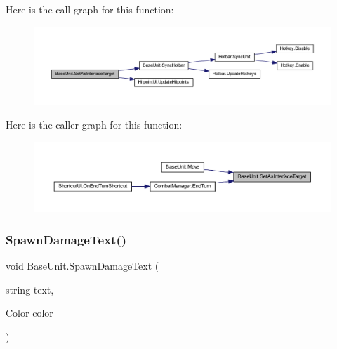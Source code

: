 Here is the call graph for this function\+:
\nopagebreak
\begin{figure}[H]
\begin{center}
\leavevmode
\includegraphics[width=350pt]{class_base_unit_abae0a52156648495ea6e8487782f8636_cgraph}
\end{center}
\end{figure}
Here is the caller graph for this function\+:
\nopagebreak
\begin{figure}[H]
\begin{center}
\leavevmode
\includegraphics[width=350pt]{class_base_unit_abae0a52156648495ea6e8487782f8636_icgraph}
\end{center}
\end{figure}
\mbox{\label{class_base_unit_aacee7b4acfdd28621f3a1b66bf8d646a}} 
\subsubsection{\texorpdfstring{SpawnDamageText()}{SpawnDamageText()}}
{\footnotesize\ttfamily void Base\+Unit.\+Spawn\+Damage\+Text (\begin{DoxyParamCaption}\item[{string}]{text,  }\item[{Color}]{color }\end{DoxyParamCaption})}

